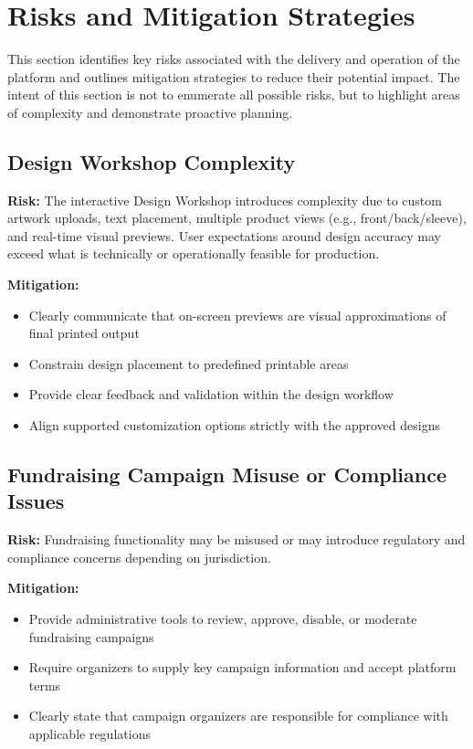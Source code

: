 \section{Risks and Mitigation Strategies}

This section identifies key risks associated with the delivery and operation of
the platform and outlines mitigation strategies to reduce their potential impact.
The intent of this section is not to enumerate all possible risks, but to highlight
areas of complexity and demonstrate proactive planning.

\subsection{Design Workshop Complexity}

\textbf{Risk:}  
The interactive Design Workshop introduces complexity due to custom artwork
uploads, text placement, multiple product views (e.g., front/back/sleeve), and
real-time visual previews. User expectations around design accuracy may exceed
what is technically or operationally feasible for production.

\textbf{Mitigation:}
\begin{itemize}[leftmargin=1.5em]
    \item Clearly communicate that on-screen previews are visual approximations
    of final printed output
    \item Constrain design placement to predefined printable areas
    \item Provide clear feedback and validation within the design workflow
    \item Align supported customization options strictly with the approved designs
\end{itemize}

\subsection{Fundraising Campaign Misuse or Compliance Issues}

\textbf{Risk:}  
Fundraising functionality may be misused or may introduce regulatory and
compliance concerns depending on jurisdiction.

\textbf{Mitigation:}
\begin{itemize}[leftmargin=1.5em]
    \item Provide administrative tools to review, approve, disable, or moderate
    fundraising campaigns
    \item Require organizers to supply key campaign information and accept
    platform terms
    \item Clearly state that campaign organizers are responsible for compliance
    with applicable regulations
\end{itemize}

